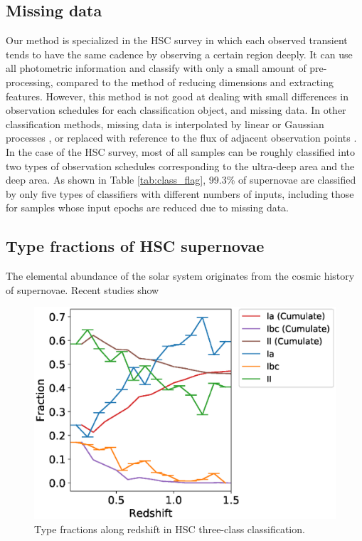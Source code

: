 \documentclass[useamsfonts]{pasj01}
\begin{document}
\subsection{Missing data}
%
Our method is specialized in the HSC survey in which each observed transient tends to have the same cadence by observing a certain region deeply.
It can use all photometric information and classify with only a small amount of pre-processing, compared to the method of reducing dimensions and extracting features. 
However, this method is not good at dealing with small differences in observation schedules for each classification object, and missing data.
In other classification methods, missing data is interpolated by linear or Gaussian processes \citep{lockner16a,Muthukrishna_2019}, or replaced with reference to the flux of adjacent observation points \citep{charnock17a}.
In the case of the HSC survey, most of all samples can be roughly classified into two types of observation schedules corresponding to the ultra-deep area and the deep area.
As shown in Table \ref{tab:class_flag}, 99.3\% of supernovae are classified by only five types of classifiers with different numbers of inputs, including those for samples whose input epochs are reduced due to missing data.
%

\subsection{Type fractions of HSC supernovae}
The elemental abundance of the solar system originates from the cosmic history of supernovae.  
Recent studies show

%
\begin{figure}[ht]
  \begin{center}
     \includegraphics[width=\columnwidth]{figures/SNfrac_alongz.eps}
  \end{center}
  \caption{%
  Type fractions along redshift in HSC three-class classification.
  }%
  \label{fig:misclass_rate_3class}
\end{figure}
%
%
%
%
\end{document}

